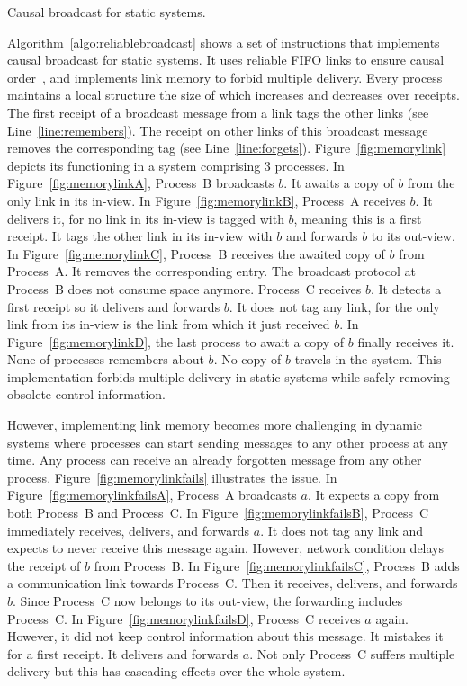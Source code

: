 \begin{algorithm}[h]
  
  \caption{\label{algo:reliablebroadcast}Causal broadcast for static systems.}
\end{algorithm}

Algorithm~\ref{algo:reliablebroadcast} shows a set of instructions that
implements causal broadcast for static systems. It uses reliable FIFO links to
ensure causal order~\cite{friedman2004causal}, and implements link memory
to forbid multiple delivery. Every process maintains a local structure the size
of which increases and decreases over receipts.  The first receipt of a
broadcast message from a link tags the other links (see
Line~\ref{line:remembers}). The receipt on other links of this broadcast message
removes the corresponding tag (see
Line~\ref{line:forgets}). Figure~\ref{fig:memorylink} depicts its functioning in
a system comprising 3 processes. In Figure~\ref{fig:memorylinkA}, Process~B
broadcasts $b$. It awaits a copy of $b$ from the only link in its in-view. In
Figure~\ref{fig:memorylinkB}, Process~A receives $b$. It delivers it, for no
link in its in-view is tagged with $b$, meaning this is a first receipt. It tags
the other link in its in-view with $b$ and forwards $b$ to its out-view. In
Figure~\ref{fig:memorylinkC}, Process~B receives the awaited copy of $b$ from
Process~A. It removes the corresponding entry. The broadcast protocol at
Process~B does not consume space anymore. Process~C receives $b$. It detects a
first receipt so it delivers and forwards $b$. It does not tag any link, for the
only link from its in-view is the link from which it just received $b$. In
Figure~\ref{fig:memorylinkD}, the last process to await a copy of $b$ finally
receives it. None of processes remembers about $b$. No copy of $b$ travels in
the system. This implementation forbids multiple delivery in static systems
while safely removing obsolete control information.



However, implementing link memory becomes more challenging in dynamic
systems where processes can start sending messages to any other process at any
time. Any process can receive an already forgotten message from any other
process. Figure~\ref{fig:memorylinkfails} illustrates the issue. In
Figure~\ref{fig:memorylinkfailsA}, Process~A broadcasts $a$. It expects a copy
from both Process~B and Process~C. In Figure~\ref{fig:memorylinkfailsB},
Process~C immediately receives, delivers, and forwards $a$. It does not tag any
link and expects to never receive this message again. However, network condition
delays the receipt of $b$ from Process~B. In Figure~\ref{fig:memorylinkfailsC},
Process~B adds a communication link towards Process~C. Then it receives,
delivers, and forwards $b$. Since Process~C now belongs to its out-view, the
forwarding includes Process~C. In Figure~\ref{fig:memorylinkfailsD}, Process~C
receives $a$ again. However, it did not keep control information about this
message. It mistakes it for a first receipt. It delivers and forwards $a$. Not
only Process~C suffers multiple delivery but this has cascading effects over the
whole system.

